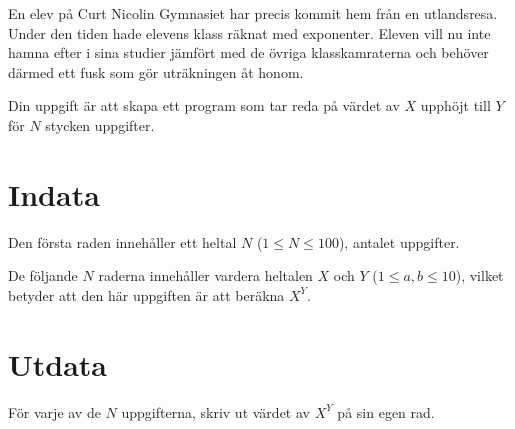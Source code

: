 En elev på Curt Nicolin Gymnasiet har precis kommit hem från en utlandsresa. Under
den tiden hade elevens klass räknat med exponenter. Eleven vill nu inte hamna efter
i sina studier jämfört med de övriga klasskamraterna och behöver därmed ett fusk som gör uträkningen åt honom.

Din uppgift är att skapa ett program som tar reda på värdet av $X$ upphöjt till $Y$ för $N$ stycken uppgifter.

\section*{Indata}
Den första raden innehåller ett heltal $N$ ($1 \leq N \leq 100$), antalet uppgifter.

De följande $N$ raderna innehåller vardera heltalen $X$ och $Y$ ($1 \leq a,b \leq 10$), 
vilket betyder att den här uppgiften är att beräkna $X^Y$.

\section*{Utdata}
För varje av de $N$ uppgifterna, skriv ut värdet av $X^Y$ på sin egen rad.

